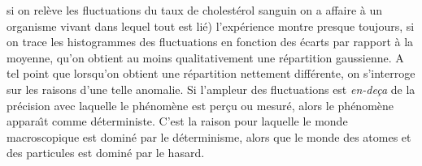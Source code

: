 si on rel\`eve les fluctuations du taux de cholest\'erol sanguin on a
affaire \`a un organisme vivant dans lequel tout est li\'e) l'exp\'erience
montre presque toujours,  si on trace les histogrammes des fluctuations
en fonction des \'ecarts par rapport \`a la moyenne,  qu'on obtient au
moins qualitativement une r\'epartition gaussienne.  A tel point que
lorsqu'on obtient une r\'epartition nettement diff\'erente,  on s'interroge
sur les raisons d'une telle anomalie.
\medskip
Si l'ampleur des fluctuations est {\it en-de\c{c}a} de la pr\'ecision avec
laquelle le ph\'enom\`ene est per\c{c}u ou mesur\'e,  alors le ph\'enom\`ene
appara{\^\i}t comme d\'eterministe.  C'est la raison pour laquelle le monde
macroscopique est domin\'e par le d\'eterminisme,  alors que le monde des
atomes et des particules est domin\'e par le hasard.

\vfill\break



\bye

